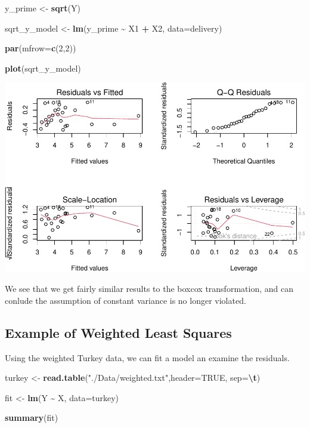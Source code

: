 \documentclass[
  11pt,
]{article}
\newenvironment{Shaded}{\begin{snugshade}}{\end{snugshade}}
\newcommand{\AttributeTok}[1]{\textcolor[rgb]{0.13,0.29,0.53}{#1}}
\newcommand{\ConstantTok}[1]{\textcolor[rgb]{0.56,0.35,0.01}{#1}}
\newcommand{\DecValTok}[1]{\textcolor[rgb]{0.00,0.00,0.81}{#1}}
\newcommand{\FunctionTok}[1]{\textcolor[rgb]{0.13,0.29,0.53}{\textbf{#1}}}
\newcommand{\NormalTok}[1]{#1}
\newcommand{\OtherTok}[1]{\textcolor[rgb]{0.56,0.35,0.01}{#1}}
\newcommand{\SpecialCharTok}[1]{\textcolor[rgb]{0.81,0.36,0.00}{\textbf{#1}}}
\newcommand{\StringTok}[1]{\textcolor[rgb]{0.31,0.60,0.02}{#1}}
\begin{document}
\begin{Shaded}
\begin{Highlighting}[]
\NormalTok{y\_prime }\OtherTok{\textless{}{-}} \FunctionTok{sqrt}\NormalTok{(Y)}

\NormalTok{sqrt\_y\_model }\OtherTok{\textless{}{-}} \FunctionTok{lm}\NormalTok{(y\_prime }\SpecialCharTok{\textasciitilde{}}\NormalTok{ X1 }\SpecialCharTok{+}\NormalTok{ X2, }\AttributeTok{data=}\NormalTok{delivery)}

\FunctionTok{par}\NormalTok{(}\AttributeTok{mfrow=}\FunctionTok{c}\NormalTok{(}\DecValTok{2}\NormalTok{,}\DecValTok{2}\NormalTok{))}

\FunctionTok{plot}\NormalTok{(sqrt\_y\_model)}
\end{Highlighting}
\end{Shaded}

\includegraphics{examples_files/figure-latex/unnamed-chunk-31-1.pdf}

We see that we get fairly similar results to the boxcox transformation,
and can conlude the assumption of constant variance is no longer
violated.

\subsection{Example of Weighted Least
Squares}\label{example-of-weighted-least-squares}

Using the weighted Turkey data, we can fit a model an examine the
residuals.

\begin{Shaded}
\begin{Highlighting}[]
\NormalTok{turkey }\OtherTok{\textless{}{-}} \FunctionTok{read.table}\NormalTok{(}\StringTok{"./Data/weighted.txt"}\NormalTok{,}\AttributeTok{header=}\ConstantTok{TRUE}\NormalTok{, }\AttributeTok{sep=}\StringTok{\textquotesingle{}}\SpecialCharTok{\textbackslash{}t}\StringTok{\textquotesingle{}}\NormalTok{)}



\NormalTok{fit }\OtherTok{\textless{}{-}} \FunctionTok{lm}\NormalTok{(Y }\SpecialCharTok{\textasciitilde{}}\NormalTok{ X, }\AttributeTok{data=}\NormalTok{turkey)}

\FunctionTok{summary}\NormalTok{(fit)}
\end{Highlighting}
\end{Shaded}
\end{document}
